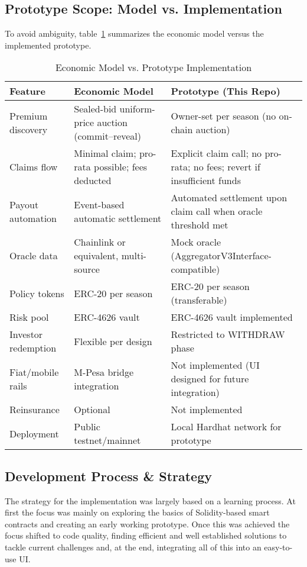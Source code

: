 \documentclass[11pt,a4paper]{article}
\begin{document}
		\subsection{Prototype Scope: Model vs. Implementation}\label{subsec:model-vs-prototype}
		To avoid ambiguity, table~\ref{tab:model-vs-prototype} summarizes the economic model versus the implemented prototype.
		\begin{table}[!h]
		\centering
		\caption{Economic Model vs. Prototype Implementation}
		\label{tab:model-vs-prototype}
		\begin{tabular}{|>{\raggedright\arraybackslash}p{}|>{\raggedright\arraybackslash}p{}|>{\raggedright\arraybackslash}p{}|}
		\hline
		\textbf{Feature} & \textbf{Economic Model} & \textbf{Prototype (This Repo)} \\
		\hline
		Premium discovery & Sealed-bid uniform-price auction (commit--reveal) & Owner-set per season (no on-chain auction) \\
		\hline
		Claims flow & Minimal claim; pro-rata possible; fees deducted & Explicit claim call; no pro-rata; no fees; revert if insufficient funds \\
		\hline
		Payout automation & Event-based automatic settlement & Automated settlement upon claim call when oracle threshold met \\
		\hline
		Oracle data & Chainlink or equivalent, multi-source & Mock oracle (AggregatorV3Interface-compatible) \\
		\hline
		Policy tokens & ERC-20 per season & ERC-20 per season (transferable) \\
		\hline
		Risk pool & ERC-4626 vault & ERC-4626 vault implemented \\
		\hline
		Investor redemption & Flexible per design & Restricted to WITHDRAW phase \\
		\hline
		Fiat/mobile rails & M-Pesa bridge integration & Not implemented (UI designed for future integration) \\
		\hline
		Reinsurance & Optional & Not implemented \\
		\hline
		Deployment & Public testnet/mainnet & Local Hardhat network\footnotemark{} for prototype \\
		\hline
		\end{tabular}
		\end{table}


		\subsection{Development Process \& Strategy}\label{subsec:dev-strategy}
		The strategy for the implementation was largely based on a learning process.
		At first the focus was mainly on exploring the basics of Solidity-based smart contracts and creating an early working prototype.
		Once this was achieved the focus shifted to code quality, finding efficient and well established solutions to tackle current challenges and, at the end, integrating all of this into an easy-to-use UI.
\end{document}
